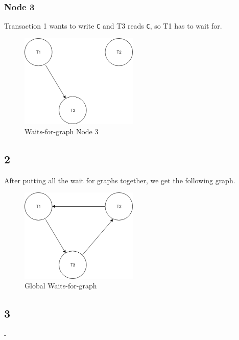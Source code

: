 \subsubsection{Node 3}
Transaction 1 wants to write \texttt{C} and T3 reads \texttt{C}, so T1 has to wait for.
\begin{figure}[htb!]
	\center
	\includegraphics[width=0.5\textwidth]{img/Node3}
	\caption{Waits-for-graph Node 3}
\end{figure}


\subsection{2}
After putting all the wait for graphs together, we get the following graph.

\begin{figure}[htb!]
	\center
	\includegraphics[width=0.5\textwidth]{img/Globalgraph}
	\caption{Global Waits-for-graph}
\end{figure}

\subsection{3}

-